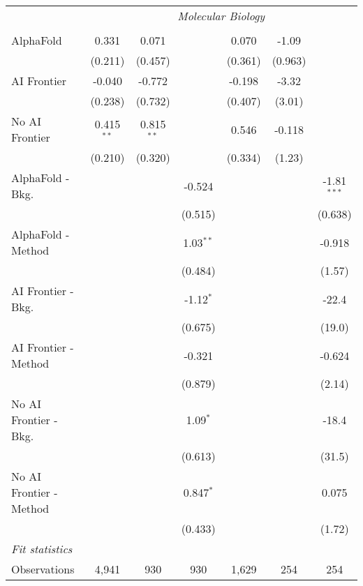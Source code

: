 \begin{tabular}{lcccccc}
 & \multicolumn{6}{c}{\textit{Molecular Biology}} \\ \\
   AlphaFold               & 0.331        & 0.071        &             & 0.070   & -1.09   &   \\   
                           & (0.211)      & (0.457)      &             & (0.361) & (0.963) &   \\   
   AI Frontier             & -0.040       & -0.772       &             & -0.198  & -3.32   &   \\   
                           & (0.238)      & (0.732)      &             & (0.407) & (3.01)  &   \\   
   No AI Frontier          & 0.415$^{**}$ & 0.815$^{**}$ &             & 0.546   & -0.118  &   \\   
                           & (0.210)      & (0.320)      &             & (0.334) & (1.23)  &   \\   
   AlphaFold - Bkg.        &              &              & -0.524      &         &         & -1.81$^{***}$\\   
                           &              &              & (0.515)     &         &         & (0.638)\\   
   AlphaFold - Method      &              &              & 1.03$^{**}$ &         &         & -0.918\\   
                           &              &              & (0.484)     &         &         & (1.57)\\   
   AI Frontier - Bkg.      &              &              & -1.12$^{*}$ &         &         & -22.4\\   
                           &              &              & (0.675)     &         &         & (19.0)\\   
   AI Frontier - Method    &              &              & -0.321      &         &         & -0.624\\   
                           &              &              & (0.879)     &         &         & (2.14)\\   
   No AI Frontier - Bkg.   &              &              & 1.09$^{*}$  &         &         & -18.4\\   
                           &              &              & (0.613)     &         &         & (31.5)\\   
   No AI Frontier - Method &              &              & 0.847$^{*}$ &         &         & 0.075\\   
                           &              &              & (0.433)     &         &         & (1.72)\\   
   \midrule
   \emph{Fit statistics}\\
   Observations            & 4,941        & 930          & 930         & 1,629   & 254     & 254\\  
   

\end{tabular}
